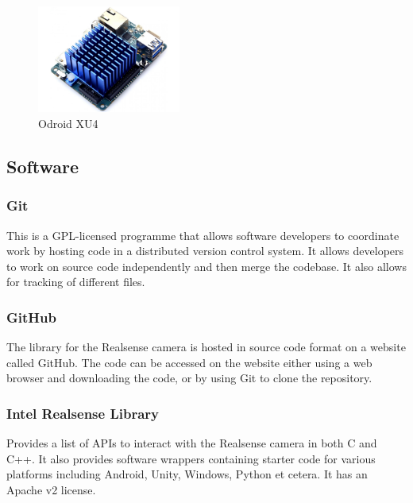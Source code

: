         \begin{figure}[h]
            \centering
            \includegraphics[height=100pt]{../img/odroid.jpg}
            \caption[]{Odroid XU4\footnotemark}
            \label{fig:odroid}
        \end{figure}
    
    \subsection{Software}
        \subsubsection{Git}
        This is a GPL-licensed programme that allows software developers to coordinate work by hosting code in a distributed version control system. It allows developers to work on source code independently and then merge the codebase. It also allows for tracking of different files.
        \subsubsection{GitHub}
        The library for the Realsense camera is hosted in source code format on a website called GitHub. The code can be accessed on the website either using a web browser and downloading the code, or by using Git to clone the repository.
        \subsubsection{Intel Realsense Library}
        Provides a list of APIs to interact with the Realsense camera in both C and C++. It also provides software wrappers containing starter code for various platforms including Android, Unity, Windows, Python et cetera. It has an Apache v2 license.


